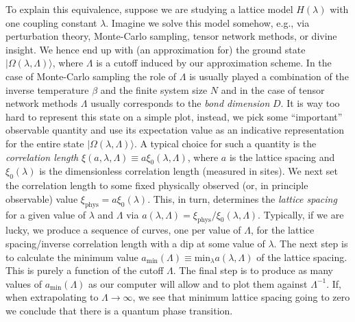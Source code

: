 \documentclass[11pt]{amsart}
\theoremstyle{plain}%
\theoremstyle{definition}
\theoremstyle{remark}
\begin{document}
To explain this equivalence, suppose we are studying a lattice model $H(\lambda)$ with one coupling constant $\lambda$. Imagine we solve this model somehow, e.g., via perturbation theory, Monte-Carlo sampling, tensor network methods, or divine insight. We hence end up with (an approximation for) the ground state $|\Omega(\lambda,\Lambda)\rangle$, where $\Lambda$ is a cutoff induced by our approximation scheme. In the case of Monte-Carlo sampling the role of $\Lambda$ is usually played a combination of the inverse temperature $\beta$ and the finite system size $N$ and in the case of tensor network methods $\Lambda$ usually corresponds to the \emph{bond dimension} $D$. It is way too hard to represent this state on a simple plot, instead, we pick some ``important'' observable quantity and use its expectation value as an indicative representation for the entire state $|\Omega(\lambda, \Lambda)\rangle$. A typical choice for such a quantity is the \emph{correlation length} $\xi(a,\lambda, \Lambda) \equiv a\xi_0(\lambda,\Lambda)$, where $a$ is the lattice spacing and $\xi_0(\lambda)$ is the dimensionless correlation length (measured in sites). We next set the correlation length to some fixed physically observed (or, in principle observable) value $\xi_{\text{phys}} = a\xi_0(\lambda)$. This, in turn, determines the \emph{lattice spacing} for a given value of $\lambda$ and $\Lambda$ via $a(\lambda, \Lambda) = \xi_{\text{phys}}/\xi_0(\lambda, \Lambda)$. Typically, if we are lucky, we produce a sequence of curves, one per value of $\Lambda$, for the lattice spacing/inverse correlation length with a dip at some value of $\lambda$. The next step is to calculate the minimum value $a_{\text{min}}(\Lambda) \equiv \text{min}_{\lambda} a(\lambda, \Lambda)$ of the lattice spacing. This is purely a function of the cutoff $\Lambda$. The final step is to produce as many values of $a_{\text{min}}(\Lambda)$ as our computer will allow and to plot them against $\Lambda^{-1}$. If, when extrapolating to $\Lambda \rightarrow \infty$, we see that minimum lattice spacing going to zero we conclude that there is a quantum phase transition. 
\end{document}
